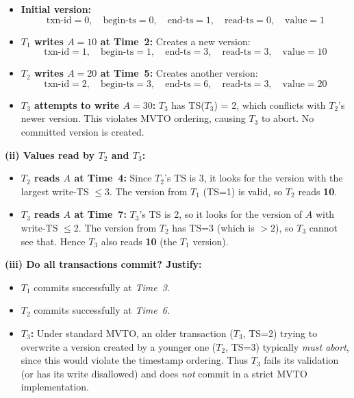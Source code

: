 \documentclass[11pt]{article}
\begin{document}
\begin{itemize}
  \item \textbf{Initial version:}
    \[
      \text{txn-id} = 0, \quad
      \text{begin-ts} = 0, \quad
      \text{end-ts} = 1, \quad
      \text{read-ts} = 0, \quad
      \text{value} = 1
    \]

  \item \textbf{$T_1$ writes $A=10$ at Time~2:}
    Creates a new version:
    \[
      \text{txn-id} = 1, \quad
      \text{begin-ts} = 1, \quad
      \text{end-ts} = 3, \quad
      \text{read-ts} = 3, \quad
      \text{value} = 10
    \]

  \item \textbf{$T_2$ writes $A=20$ at Time~5:}
    Creates another version:
    \[
      \text{txn-id} = 2, \quad
      \text{begin-ts} = 3, \quad
      \text{end-ts} = 6, \quad
      \text{read-ts} = 3, \quad
      \text{value} = 20
    \]

  \item \textbf{$T_3$ attempts to write $A=30$:}
    $T_3$ has TS($T_3$) = 2, which conflicts with $T_2$'s newer version. This violates MVTO ordering, causing $T_3$ to abort. No committed version is created.
\end{itemize}

\noindent
\textbf{(ii) Values read by $T_2$ and $T_3$:}

\begin{itemize}
  \item \textbf{$T_2$ reads $A$ at Time~4:}
    Since $T_2$’s TS is 3, it looks for the version with the largest write-TS $\le 3.$  
    The version from $T_1$ (TS=1) is valid, so $T_2$ reads \textbf{10}.
  \item \textbf{$T_3$ reads $A$ at Time~7:}
    $T_3$’s TS is 2, so it looks for the version of $A$ with write-TS $\le 2.$  
    The version from $T_2$ has TS=3 (which is $>2$), so $T_3$ cannot see that.  
    Hence $T_3$ also reads \textbf{10} (the $T_1$ version).
\end{itemize}

\noindent
\textbf{(iii) Do all transactions commit?  Justify:}

\begin{itemize}
  \item $T_1$ commits successfully at \emph{Time~3.}
  \item $T_2$ commits successfully at \emph{Time~6.}
  \item \textbf{$T_3$:} Under standard MVTO, an older transaction ($T_3$, TS=2) trying to overwrite a version created by a younger one ($T_2$, TS=3) typically \emph{must abort}, since this would violate the timestamp ordering.  Thus $T_3$ fails its validation (or has its write disallowed) and does \emph{not} commit in a strict MVTO implementation.
\end{itemize}
\end{document}
